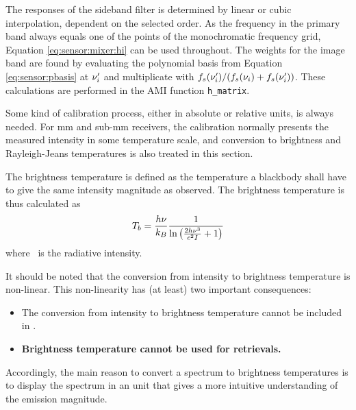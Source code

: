  \label{sec:sensor:mixer:practical}
 
 The responses of the sideband filter is determined by linear or cubic
 interpolation, dependent on the selected order.
 As the frequency in the primary band always equals one of the points
 of the monochromatic frequency grid, Equation
 \ref{eq:sensor:mixer:hi} can be used throughout. The weights for the
 image band are found by evaluating the polynomial basis from Equation
 \ref{eq:sensor:pbasis} at $\nu_i'$ and multiplicate with 
 $f_s(\nu_i') / (f_s(\nu_i)+f_s(\nu_i'))$. These calculations are 
 performed in the AMI function \verb|h_matrix|.

 
 \label{sec:sensor:tb}

 Some kind of calibration process, either in absolute or relative units,
 is always needed. For mm and sub-mm receivers, the calibration normally
 presents the measured intensity in some temperature scale, and conversion
 to brightness and Rayleigh-Jeans temperatures is also treated in this section.


 \label{sec:sensor:tb_planck}

 The brightness temperature is defined as the temperature a blackbody 
 shall have to give the same intensity magnitude as observed. The 
 brightness temperature is thus calculated as
 \begin{equation}
   T_b = \frac{h\nu}{k_B} \frac{1}{\ln{ \left( \frac{2h\ensuremath{\nu}^3}{c^2\ensuremath{I}}+1 \right)}}
   \label{eq:sensor:cal:tb}
 \end{equation}
 where \mpbi\ is the radiative intensity.
 
 It should be noted that the conversion from intensity to brightness
 temperature is non-linear. This non-linearity has (at least) two important
 consequences:
 \begin{itemize}
  \item The conversion from intensity to brightness temperature cannot be
        included in \Hm.
  \item \bf{Brightness temperature cannot be used for retrievals.}
 \end{itemize}
 Accordingly, the main reason to convert a spectrum to brightness
 temperatures is to display the spectrum in an unit that gives a more
 intuitive understanding of the emission magnitude.


 \label{sec:sensor:tb:rj}

